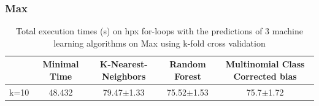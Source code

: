 \subsubsection{Max}
\begin{table}[h]
	\centering
	\caption{Total execution times (s) on hpx for-loops with the predictions of 3 machine learning algorithms on Max using k-fold cross validation}
	\label{my-label}
	\begin{tabular}{|c|c|c|c|c|}
		\hline
		& Minimal Time&K-Nearest-Neighbors & Random Forest &Multinomial Class Corrected bias\\ \hline
		k=10  &48.432&
		79.47$\pm$1.33       & 75.52$\pm$1.53&75.7$\pm$1.72 \\ \hline
	\end{tabular}
\end{table}

